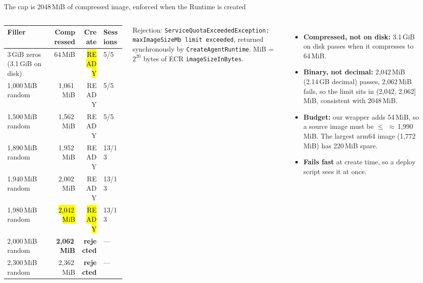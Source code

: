 \begin{frame}{The cap is 2048\,MiB of compressed image, enforced when the Runtime is created}
\begin{columns}[T]
\scriptsize\setlength{\tabcolsep}{3pt}
\begin{tabular}{@{}lrrl@{}}
\toprule
\textbf{Filler} & \textbf{Compressed} & \textbf{Create} & \textbf{Sessions}\\
\midrule
3\,GiB zeros (3.1\,GiB on disk) & 64\,MiB & \hl{READY} & 5/5\\
1,000\,MiB random & 1,061\,MiB & READY & 5/5\\
1,500\,MiB random & 1,562\,MiB & READY & 5/5\\
1,890\,MiB random & 1,952\,MiB & READY & 13/13\\
1,940\,MiB random & 2,002\,MiB & READY & 13/13\\
1,980\,MiB random & \hl{2,042\,MiB} & \hl{READY} & 13/13\\
2,000\,MiB random & \textbf{2,062\,MiB} & \textcolor{awsmagenta}{\textbf{rejected}} & ---\\
2,300\,MiB random & 2,362\,MiB & \textcolor{awsmagenta}{\textbf{rejected}} & ---\\
\bottomrule
\end{tabular}
\par\vspace{2mm}
{\scriptsize\color{inkmuted}Rejection: \texttt{ServiceQuotaExceededException: maxImageSizeMb limit exceeded}, returned synchronously by \texttt{CreateAgentRuntime}. MiB = $2^{20}$ bytes of ECR \texttt{imageSizeInBytes}.\par}
\begin{itemize}\footnotesize\setlength{\itemsep}{1.5mm}
\item \textbf{Compressed, not on disk:} 3.1\,GiB on disk passes when it compresses to 64\,MiB.
\item \textbf{Binary, not decimal:} 2,042\,MiB (2.14\,GB decimal) passes, 2,062\,MiB fails, so the limit sits in (2,042, 2,062] MiB, consistent with 2048\,MiB.
\item \textbf{Budget:} our wrapper adds 54\,MiB, so a source image must be $\le$ $\approx$\,1,990\,MiB. The largest arm64 image (1,772\,MiB) has 220\,MiB spare.
\item \textbf{Fails fast} at create time, so a deploy script sees it at once.
\end{itemize}
\end{columns}
\end{frame}

